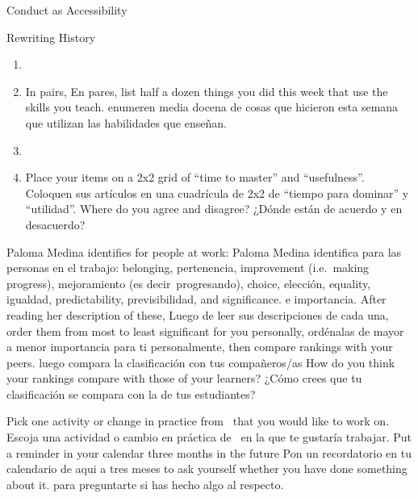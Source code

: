 \begin{aside}{Conduct as Accessibility}
\begin{aside}{Rewriting History}


\begin{enumerate}

\item
\item
  In pairs,
  En pares,
  list half a dozen things you did this week that use the skills you teach.
  enumeren media docena de cosas que hicieron esta semana que utilizan las habilidades que enseñan.

\item
\item
  Place your items on a 2x2 grid of ``time to master'' and ``usefulness''.
  Coloquen sus artículos en una cuadrícula de 2x2 de ``tiempo para dominar'' y ``utilidad''.
  Where do you agree and disagree?
  ¿Dónde están de acuerdo y en desacuerdo?

\end{enumerate}


Paloma Medina identifies  for people at work:
Paloma Medina identifica  para las personas en el trabajo:
belonging,
pertenencia,
improvement (i.e.\ making progress),
mejoramiento (es decir\ progresando),
choice,
elección,
equality,
igualdad,
predictability,
previsibilidad,
and significance.
e importancia.
After reading her description of these,
Luego de leer sus descripciones de cada una,
order them from most to least significant for you personally,
ordénalas de mayor a menor importancia para ti personalmente,
then compare rankings with your peers.
luego compara la clasificación con tus compañeros/as
How do you think your rankings compare with those of your learners?
¿Cómo crees que tu clasificación se compara con la de tus estudiantes?


Pick one activity or change in practice from~\cite{Lee2017} that you would like to work on.
Escoja una actividad o cambio en práctica de~\cite{Lee2017} en la que te gustaría trabajar.
Put a reminder in your calendar three months in the future
Pon un recordatorio en tu calendario de aqui a tres meses
to ask yourself whether you have done something about it.
para preguntarte si has hecho algo al respecto.


\end{aside}
\end{aside}
